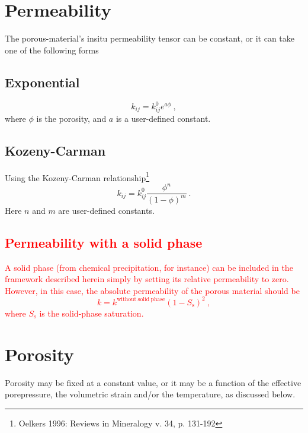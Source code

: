 \documentclass[12pt]{report}
\begin{document}
\section{Permeability}
\label{perm.sec}

The porous-material's insitu permeability tensor can be constant, or
it can take one of the following forms

\subsection{Exponential}

\begin{equation}
k_{ij} = k_{ij}^{0} e^{a\phi} \ ,
\end{equation}
where $\phi$ is the porosity, and $a$ is a user-defined constant.

\subsection{Kozeny-Carman}

Using the Kozeny-Carman relationship\footnote{Oelkers
1996: Reviews in Mineralogy v. 34, p. 131-192}
\begin{equation}
k_{ij} = k_{ij}^{0} \frac{\phi^{n}}{(1 - \phi)^{m}} \ .
\end{equation}
Here $n$ and $m$ are user-defined constants.

\subsection{\textcolor{red}{Permeability with a solid phase}}

\textcolor{red}{
A solid phase (from chemical precipitation, for instance) can be
included in the framework described herein simply by setting its
relative permeability to zero.  However, in this case, the absolute
permeability of the porous material should be
\begin{equation}
k = k^{\mathrm{without\ solid\ phase}}(1 - S_{\mathrm{s}})^{2} \ ,
\end{equation}
where $S_{\mathrm{s}}$ is the solid-phase saturation.
}

\section{Porosity}
\label{por.sec}

Porosity may be fixed at a constant value, or it may be a function of
the effective porepressure, the volumetric strain and/or the
temperature, as discussed below.
\end{document}
